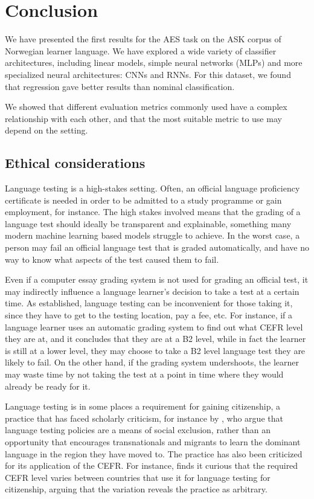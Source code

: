 \chapter{Conclusion}

We have presented the first results for the \ac{AES} task on the ASK corpus
of Norwegian learner language. We have explored a wide variety of classifier
architectures, including linear models, simple neural networks (\acp{MLP})
and more specialized neural architectures: \acp{CNN} and \acp{RNN}. For this
dataset, we found that regression gave better results than nominal
classification.

We showed that different evaluation metrics commonly used have a complex
relationship with each other, and that the most suitable metric to use may
depend on the setting.


\section{Ethical considerations}

Language testing is a high-stakes setting. Often, an official language
proficiency certificate is needed in order to be admitted to a study
programme or gain employment, for instance. The high stakes involved means
that the grading of a language test should ideally be transparent and
explainable, something many modern machine learning based models struggle to
achieve. In the worst case, a person may fail an official language test that
is graded automatically, and have no way to know what aspects of the test
caused them to fail.

Even if a computer essay grading system is not used for grading an official
test, it may indirectly influence a language learner's decision to take a
test at a certain time. As established, language testing can be inconvenient
for those taking it, since they have to get to the testing location, pay a
fee, etc. For instance, if a language learner uses an automatic grading
system to find out what CEFR level they are at, and it concludes that they
are at a B2 level, while in fact the learner is still at a lower level, they
may choose to take a B2 level language test they are likely to fail. On the
other hand, if the grading system undershoots, the learner may waste time by
not taking the test at a point in time where they would already be ready for
it.

Language testing is in some places a requirement for gaining citizenship, a
practice that has faced scholarly criticism, for instance by
\textcite[162]{weberhorner}, who argue that language testing policies are a
means of social exclusion, rather than an opportunity that encourages
transnationals and migrants to learn the dominant language in the region they
have moved to. The practice has also been criticized for its application of
the \ac{CEFR}. For instance, \textcite{van2009fortress} finds it curious that
the required CEFR level varies between countries that use it for language
testing for citizenship, arguing that the variation reveals the practice as
arbitrary.

